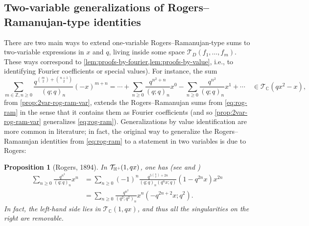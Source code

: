 \documentclass[reqno,11pt]{amsart}
\newtheorem{proposition}[theorem]{Proposition}
\theoremstyle{definition}
\theoremstyle{remark}
\numberwithin{equation}{section}
\newcommand{\Z}{\mathbb{Z}}
\newcommand{\C}{\mathbb{C}}
\newcommand{\Hplus}{{\mathbb{H}^{\textnormal{+}\hspace{-0.03cm}}}}
\newcommand{\mT}{\mathcal{T}}
\begin{document}
\subsection{Two-variable generalizations of Rogers--Ramanujan-type identities}\label{subsec:two-var-generaliz}
There are two main ways to extend one-variable Rogers--Ramanujan-type sums to two-variable expressions in $x$ and $q$, living inside some space $\mT_D(f_1, \ldots, f_m)$. These ways correspond to \cref{lem:proofs-by-fourier,lem:proofs-by-value}, i.e., to identifying Fourier coefficients or special values). For instance, the sum
\begin{equation} \label{eq:two-variable-statement-sum}
    \sum_{m \in \Z, n \ge 0} \frac{q^{\binom{m}{2} + \binom{n+1}{2}}}{(q; q)_n} (-x)^{m+n}
    =
    \cdots +
    \sum_{n \ge 0} \frac{q^{n^2+n}}{(q; q)_n} x^0
    -
    \sum_{n \ge 0} \frac{q^{n^2}}{(q; q)_n} x^1
    +
    \cdots
    \quad \in \mT_\C\left(qx^2 -x \right),
\end{equation}
from \cref{prop:2var-rog-ram-var}, extends the Rogers--Ramanujan sums from \cref{eq:rog-ram} in the sense that it contains them as Fourier coefficients (and so \cref{prop:2var-rog-ram-var} generalizes \cref{eq:rog-ram}). Generalizations by value identification are more common in literature; in fact, the original way to generalize the Rogers--Ramanujan identities from \cref{eq:rog-ram} to a statement in two variables is due to Rogers:
\begin{proposition}[Rogers, 1894] \label{prop:rogers}
In $\mT_\Hplus(1, qx)$, one has (see \cite[p.~292--294]{hardy1979introduction} and \cite[p.~330]{rogers1893second})
\begin{equation} \label{eq:rogers}
\begin{aligned}
    \sum_{n \geq 0} \frac{q^{n^2}}{(q; q)_n} x^n 
    &= 
    \sum_{n \geq 0}(-1)^n \frac{q^{5\binom{n}{2}+2n}}{(q; q)_n \left(q^n x; q\right)} \left(1 - q^{2n} x\right) x^{2n}
    \\
    &=
    \sum_{n \ge 0} 
    \frac{q^{n^2}}{\left(q^2; q^2\right)_n} x^n \left(-q^{2n+2} x; q^2\right).
\end{aligned}
\end{equation}
In fact, the left-hand side lies in $\mT_\C(1, qx)$, and thus all the singularities on the right are removable.
\end{proposition}
\end{document}
